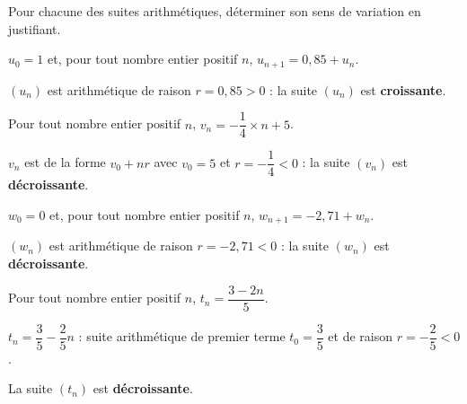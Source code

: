 \documentclass[12pt,a4paper]{book}
\begin{document}
\noindent Pour chacune des suites arithmétiques, déterminer son sens de variation en justifiant.

\exerciceDS{}

\begin{enumMet}
	\item $u_0=1$ et, pour tout nombre entier positif $n$, $u_{n+1}=0,85+u_n$.

	\begin{corrBox}
		$(u_n)$ est arithmétique de raison $r=0,85>0$ : la suite $(u_n)$ est \textbf{croissante}.
	\end{corrBox}
	\item Pour tout nombre entier positif $n$, $v_n=-\dfrac{1}{4}\times n+5$.

	\begin{corrBox}
		$v_n$ est de la forme $v_0+nr$ avec $v_0=5$ et $r=-\dfrac{1}{4}<0$ : la suite $(v_n)$ est \textbf{décroissante}.
	\end{corrBox}
	\item $w_0=0$ et, pour tout nombre entier positif $n$, $w_{n+1}=-2,71+w_n$.

	\begin{corrBox}
		$(w_n)$ est arithmétique de raison $r=-2,71<0$ : la suite $(w_n)$ est \textbf{décroissante}.
	\end{corrBox}
	\item Pour tout nombre entier positif $n$, $t_n=\dfrac{3-2n}{5}$.

	\begin{corrBox}
		$t_n=\dfrac{3}{5}-\dfrac{2}{5}n$ : suite arithmétique de premier terme $t_0=\dfrac{3}{5}$ et de raison $r=-\dfrac{2}{5}<0$.

		La suite $(t_n)$ est \textbf{décroissante}.
	\end{corrBox}
\end{enumMet}

\exerciceDS{}
\end{document}
